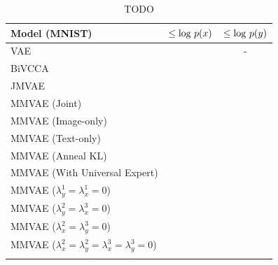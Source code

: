 \documentclass{article}
\begin{document}
\begin{table}[!h]
    \centering
    \begin{tabular}{ l | c | c }
        Model (MNIST) & $\leq \textup{log }p(x)$ & $\leq \textup{log }p(y)$ \\
        \hline
        VAE & & - \\
        BiVCCA & &  \\
        JMVAE & & \\
        MMVAE (Joint) & & \\
        MMVAE (Image-only) & & \\
        MMVAE (Text-only) & & \\
        MMVAE (Anneal KL) & & \\
        MMVAE (With Universal Expert) & & \\
        MMVAE ($\lambda_{y}^{1} = \lambda_{x}^{1} = 0$) & & \\
        MMVAE ($\lambda_{y}^{2} = \lambda_{x}^{3} = 0$) & & \\
        MMVAE ($\lambda_{x}^{2} = \lambda_{y}^{3} = 0$) & & \\
        MMVAE ($\lambda_{x}^{2} = \lambda_{y}^{2} = \lambda_{x}^{3} = \lambda_{y}^{3} = 0$) & & \\
        \newline
    \end{tabular}
    \caption{TODO}
    \label{table:mnist:marginal}
\end{table}
\end{document}
